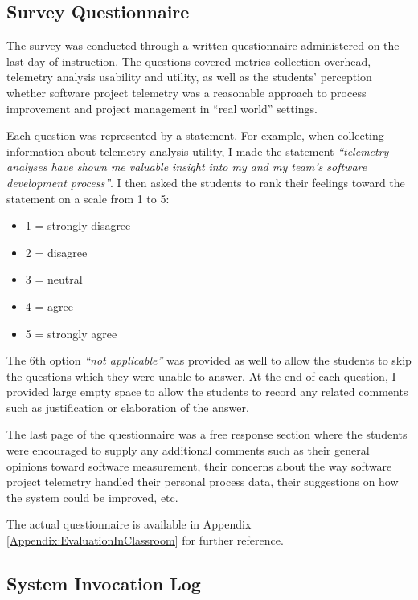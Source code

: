 \subsection{Survey Questionnaire} \label{EvaluationInClassroom:Survey}

The survey was conducted through a written questionnaire administered on the last day of instruction. The questions covered metrics collection overhead, telemetry analysis usability and utility, as well as the students' perception whether software project telemetry was a reasonable approach to process improvement and project management in ``real world'' settings.

Each question was represented by a statement. For example, when collecting information about telemetry analysis utility, I made the statement \textit{``telemetry analyses have shown me valuable insight into my and my team's software development process''}. I then asked the students to rank their feelings toward the statement on a scale from 1 to 5:

\begin{itemize}
	\item 1 = strongly disagree
	\item 2 = disagree
	\item 3 = neutral
	\item 4 = agree
	\item 5 = strongly agree
\end{itemize}

The 6th option \textit{``not applicable''} was provided as well to allow the students to skip the questions which they were unable to answer. At the end of each question, I provided large empty space to allow the students to record any related comments such as justification or elaboration of the answer.

The last page of the questionnaire was a free response section where the students were encouraged to supply any additional comments such as their general opinions toward software measurement, their concerns about the way software project telemetry handled their personal process data, their suggestions on how the system could be improved, etc.

The actual questionnaire is available in Appendix \ref{Appendix:EvaluationInClassroom} for further reference.


\subsection{System Invocation Log} \label{EvaluationInClassroom:InvocationLog}

